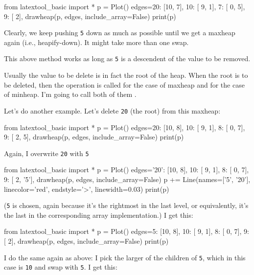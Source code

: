 \begin{python}
from latextool_basic import *
p = Plot()
edges={20: [10, 7],
       10: [ 9, 1],
        7: [ 0, 5],
        9: [ 2],
      }
drawheap(p, edges, include_array=False)
print(p)
\end{python}

Clearly, we keep pushing \texttt{5} down as much as possible until
we get a maxheap again (i.e., heapify-down).
It might take more than one swap.

This above method works as long as \texttt{5} is a descendent of the
value to be removed.

Usually the value to be delete is in fact the root of the heap.
When the root is to be deleted, then the operation is called
 for the case of maxheap
and  for the case of
minheap.
I'm going to call both of them .

Let's do another example.
Let's delete \texttt{20} (the root) from this maxheap:

\begin{python}
from latextool_basic import *
p = Plot()
edges={20: [10, 8],
       10: [ 9, 1],
        8: [ 0, 7],
        9: [ 2, 5],
      }
drawheap(p, edges, include_array=False)
print(p)
\end{python}


Again, I overwrite \texttt{20} with \texttt{5}

\begin{python}
from latextool_basic import *
p = Plot()
edges={'20': [10, 8],
       10: [ 9, 1],
        8: [ 0, 7],
        9: [ 2, '5'],
      }
drawheap(p, edges, include_array=False)
p += Line(names=['5', '20'], linecolor='red', endstyle='>', linewidth=0.03)      
print(p)
\end{python}

(\texttt{5} is chosen, again because it's the rightmost
in the last level, or equivalently, it's the last in the
corresponding array implementation.)
I get this:

\begin{python}
from latextool_basic import *
p = Plot()
edges={5: [10, 8],
       10: [ 9, 1],
        8: [ 0, 7],
        9: [ 2],
      }
drawheap(p, edges, include_array=False)
print(p)
\end{python}

I do the same again as above: I pick the larger of the children
of \texttt{5}, which in this case is \texttt{10} and swap with \texttt{5}.
I get this:

